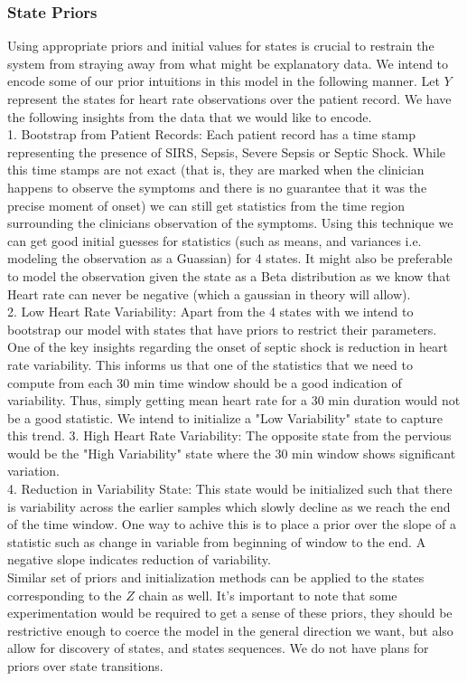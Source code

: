 \documentclass[12pt,solutions]{article}
\begin{document}
\subsubsection{State Priors}
Using appropriate priors and initial values for states is crucial to restrain the system from straying away from what might be explanatory data. We intend to encode some of our prior intuitions in this model in the following manner. Let ${Y}$ represent the states for heart rate observations over the patient record. We have the following insights from the data that we would like to encode.\\
1. Bootstrap from Patient Records: Each patient record has a time stamp representing the presence of SIRS, Sepsis, Severe Sepsis or Septic Shock. While this time stamps are not exact (that is, they are marked when the clinician happens to observe the symptoms and there is no guarantee that it was the precise moment of onset) we can still get statistics from the time region surrounding the clinicians observation of the symptoms. Using this technique we can get good initial guesses for statistics (such as means, and variances i.e. modeling the observation as a Guassian) for 4 states. It might also be preferable to model the observation given the state as a Beta distribution as we know that Heart rate can never be negative (which a gaussian in theory will allow).\\
2. Low Heart Rate Variability: Apart from the 4 states with we intend to bootstrap our model with states that have priors to restrict their parameters. One of the key insights regarding the onset of septic shock is reduction in heart rate variability. This informs us that one of the statistics that we need to compute from each 30 min time window should be a good indication of variability. Thus, simply getting mean heart rate for a 30 min duration would not be a good statistic. We intend to initialize a "Low Variability" state to capture this trend.
3. High Heart Rate Variability: The opposite state from the pervious would be the "High Variability" state where the 30 min window shows significant variation.\\
4. Reduction in Variability State: This state would be initialized such that there is variability across the earlier samples which slowly decline as we reach the end of the time window. One way to achive this is to place a prior over the slope of a statistic such as change in variable from beginning of window to the end. A negative slope indicates reduction of variability.\\
Similar set of priors and initialization methods can be applied to the states corresponding to the ${Z}$ chain as well. It's important to note that some experimentation would be required to get a sense of these priors, they should be restrictive enough to coerce the model in the general direction we want, but also allow for discovery of states, and states sequences. We do not have plans for priors over state transitions.
\end{document}

